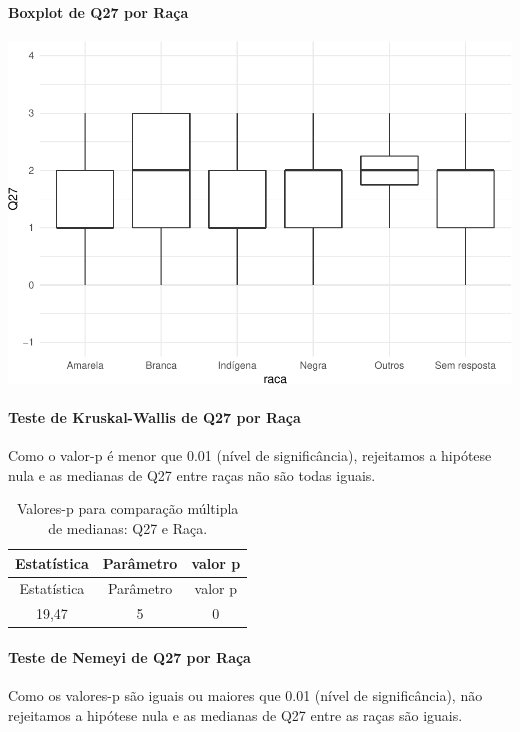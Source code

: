 \documentclass[]{article}
\let\oldparagraph\paragraph
\renewcommand{\paragraph}[1]{\oldparagraph{#1}\mbox{}}
\begin{document}
\hypertarget{boxplot-de-q27-por-rauxe7a}{%
\paragraph{Boxplot de Q27 por Raça}\label{boxplot-de-q27-por-rauxe7a}}

\begin{center}\includegraphics[width=0.75\linewidth]{relatorio_covid19_files/figure-latex/unnamed-chunk-815-1} \end{center}

\hypertarget{teste-de-kruskal-wallis-de-q27-por-rauxe7a}{%
\paragraph{Teste de Kruskal-Wallis de Q27 por Raça}\label{teste-de-kruskal-wallis-de-q27-por-rauxe7a}}

Como o valor-p é menor que 0.01 (nível de significância), rejeitamos a hipótese nula e as medianas de Q27 entre raças não são todas iguais.

\begin{longtable}[]{@{}ccc@{}}
\caption{\label{tab:unnamed-chunk-817}Valores-p para comparação múltipla de medianas: Q27 e Raça.}\tabularnewline
\toprule
Estatística & Parâmetro & valor p\tabularnewline
\midrule
\endfirsthead
\toprule
Estatística & Parâmetro & valor p\tabularnewline
\midrule
\endhead
19,47 & 5 & 0\tabularnewline
\bottomrule
\end{longtable}

\hypertarget{teste-de-nemeyi-de-q27-por-rauxe7a}{%
\paragraph{Teste de Nemeyi de Q27 por Raça}\label{teste-de-nemeyi-de-q27-por-rauxe7a}}

Como os valores-p são iguais ou maiores que 0.01 (nível de significância), não rejeitamos a hipótese nula e as medianas de Q27 entre as raças são iguais.
\end{document}
